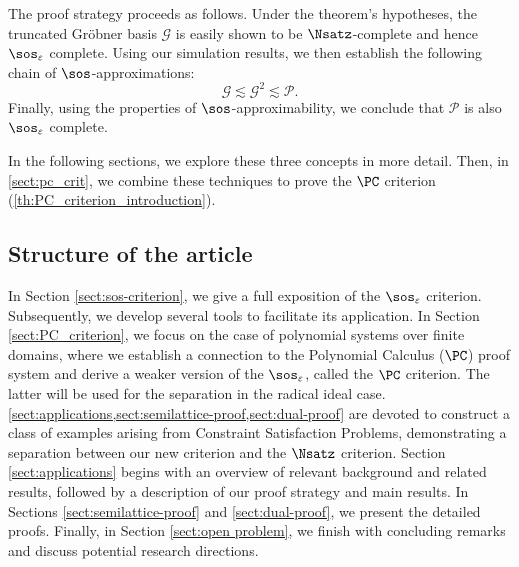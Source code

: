 \documentclass[11pt]{article}
\begin{document}
\begin{enumerate}
The proof strategy proceeds as follows. Under the theorem’s hypotheses, the truncated Gröbner basis $\mathcal{G}$ is easily shown to be $\Nsatz$-complete and hence $\sos_\varepsilon$ complete. Using our simulation results, we then establish the following chain of $\sos$-approximations:
   $$\mathcal{G}\lesssim \mathcal{G}^2 \lesssim \mathcal{P}.$$
Finally, using the properties of $\sos$-approximability, we conclude that $\mathcal{P}$ is also $\sos_\varepsilon$ complete. 
\end{enumerate}

In the following sections, we explore these three concepts in more detail. Then, in \cref{sect:pc_crit}, we combine these techniques to prove the $\PC$ criterion (\cref{th:PC_criterion_introduction}).

\subsection{Structure of the article}
In Section \ref{sect:sos-criterion}, we give a full exposition of the $\sos_\varepsilon$ criterion. Subsequently, we develop several tools to facilitate its application. In Section \ref{sect:PC_criterion}, we focus on the case of polynomial systems over finite domains, where we establish a connection to the Polynomial Calculus ($\PC$) proof system and derive a weaker version of the $\sos_\varepsilon$, called the $\PC$ criterion. The latter will be used for the separation in the radical ideal case. \cref{sect:applications,sect:semilattice-proof,sect:dual-proof} are devoted to construct a class of examples arising from Constraint Satisfaction Problems, demonstrating a separation between our new criterion and the $\Nsatz$ criterion. Section \ref{sect:applications} begins with an overview of relevant background and related results, followed by a description of our proof strategy and main results. In Sections \ref{sect:semilattice-proof} and \ref{sect:dual-proof}, we present the detailed proofs. 
Finally, in Section \ref{sect:open problem}, we finish with concluding remarks and discuss potential research directions.
\end{document}
